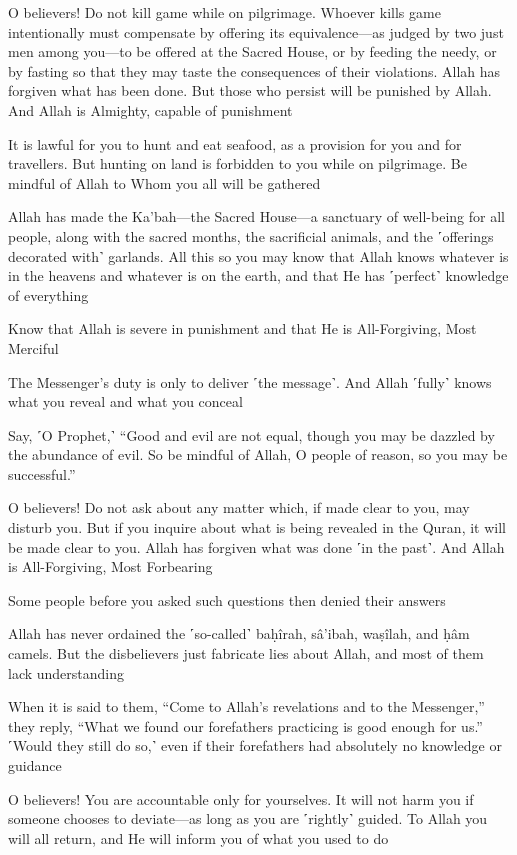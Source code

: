 O believers! Do not kill game while on pilgrimage. Whoever kills game intentionally must compensate by offering its equivalence—as judged by two just men among you—to be offered at the Sacred House, or by feeding the needy, or by fasting so that they may taste the consequences of their violations. Allah has forgiven what has been done. But those who persist will be punished by Allah. And Allah is Almighty, capable of punishment

It is lawful for you to hunt and eat seafood, as a provision for you and for travellers. But hunting on land is forbidden to you while on pilgrimage. Be mindful of Allah to Whom you all will be gathered

Allah has made the Ka’bah—the Sacred House—a sanctuary of well-being for all people, along with the sacred months, the sacrificial animals, and the ˹offerings decorated with˺ garlands. All this so you may know that Allah knows whatever is in the heavens and whatever is on the earth, and that He has ˹perfect˺ knowledge of everything

Know that Allah is severe in punishment and that He is All-Forgiving, Most Merciful

The Messenger’s duty is only to deliver ˹the message˺. And Allah ˹fully˺ knows what you reveal and what you conceal

Say, ˹O Prophet,˺ “Good and evil are not equal, though you may be dazzled by the abundance of evil. So be mindful of Allah, O people of reason, so you may be successful.”

O believers! Do not ask about any matter which, if made clear to you, may disturb you. But if you inquire about what is being revealed in the Quran, it will be made clear to you. Allah has forgiven what was done ˹in the past˺. And Allah is All-Forgiving, Most Forbearing

Some people before you asked such questions then denied their answers

Allah has never ordained the ˹so-called˺ baḥîrah, sâ'ibah, waṣîlah, and ḥâm camels. But the disbelievers just fabricate lies about Allah, and most of them lack understanding

When it is said to them, “Come to Allah’s revelations and to the Messenger,” they reply, “What we found our forefathers practicing is good enough for us.” ˹Would they still do so,˺ even if their forefathers had absolutely no knowledge or guidance

O believers! You are accountable only for yourselves. It will not harm you if someone chooses to deviate—as long as you are ˹rightly˺ guided. To Allah you will all return, and He will inform you of what you used to do

